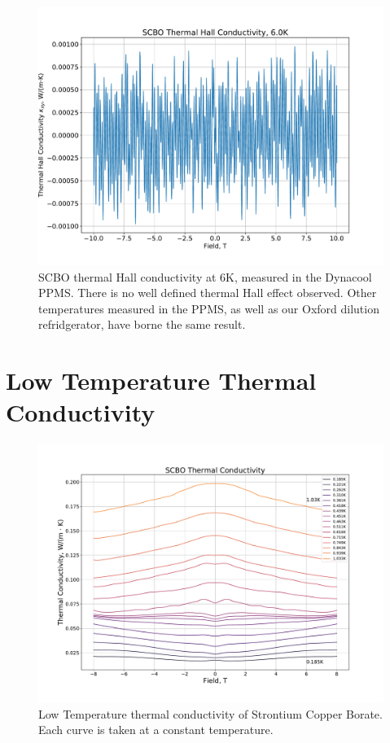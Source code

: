 \documentclass{thesis-umich}
\begin{document}
\begin{figure}
	\centering
	\caption[SCBO Thermal Hall: Negative Result]{SCBO thermal Hall conductivity at 6K, measured in the Dynacool PPMS. There is no well defined thermal Hall effect observed. Other temperatures measured in the PPMS, as well as our Oxford dilution refridgerator, have borne the same result.}
	\includegraphics[width=\columnwidth]{figures/SCBO_Thermal_Hall_Negative.pdf}
\end{figure}


\section{Low Temperature Thermal Conductivity}
\begin{figure}
	\caption[Low Temperature Thermal Conductivity of SCBO]{Low Temperature thermal conductivity of Strontium Copper Borate. Each curve is taken at a constant temperature.}
	\includegraphics[width=\columnwidth]{figures/SCBO_kappa_xx_vs_B_1.pdf}
\end{figure}
\end{document}
